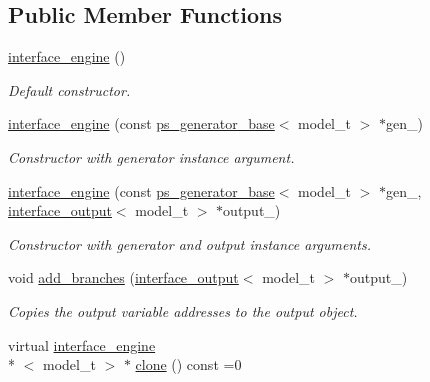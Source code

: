\subsection*{Public Member Functions}
\begin{DoxyCompactItemize}
\item 
\hypertarget{a00314_a343963d3ea0e66429432e8496534c142}{\hyperlink{a00314_a343963d3ea0e66429432e8496534c142}{interface\-\_\-engine} ()}\label{a00314_a343963d3ea0e66429432e8496534c142}

\begin{DoxyCompactList}\small\item\em Default constructor. \end{DoxyCompactList}\item 
\hypertarget{a00314_ad342ed491c8c93e057a8581496fd9dd7}{\hyperlink{a00314_ad342ed491c8c93e057a8581496fd9dd7}{interface\-\_\-engine} (const \hyperlink{a00442}{ps\-\_\-generator\-\_\-base}$<$ model\-\_\-t $>$ $\ast$gen\-\_\-)}\label{a00314_ad342ed491c8c93e057a8581496fd9dd7}

\begin{DoxyCompactList}\small\item\em Constructor with generator instance argument. \end{DoxyCompactList}\item 
\hypertarget{a00314_aa7f1746c6c1a6b5d382308423a16b086}{\hyperlink{a00314_aa7f1746c6c1a6b5d382308423a16b086}{interface\-\_\-engine} (const \hyperlink{a00442}{ps\-\_\-generator\-\_\-base}$<$ model\-\_\-t $>$ $\ast$gen\-\_\-, \hyperlink{a00315}{interface\-\_\-output}$<$ model\-\_\-t $>$ $\ast$output\-\_\-)}\label{a00314_aa7f1746c6c1a6b5d382308423a16b086}

\begin{DoxyCompactList}\small\item\em Constructor with generator and output instance arguments. \end{DoxyCompactList}\item 
\hypertarget{a00314_abcf2a665d45d27762db5e3ba01eae5e1}{void \hyperlink{a00314_abcf2a665d45d27762db5e3ba01eae5e1}{add\-\_\-branches} (\hyperlink{a00315}{interface\-\_\-output}$<$ model\-\_\-t $>$ $\ast$output\-\_\-)}\label{a00314_abcf2a665d45d27762db5e3ba01eae5e1}

\begin{DoxyCompactList}\small\item\em Copies the output variable addresses to the output object. \end{DoxyCompactList}\item 
\hypertarget{a00314_a756e355ca2e52d691dc616acaa3e61be}{virtual \hyperlink{a00314}{interface\-\_\-engine}\\*
$<$ model\-\_\-t $>$ $\ast$ \hyperlink{a00314_a756e355ca2e52d691dc616acaa3e61be}{clone} () const =0}\label{a00314_a756e355ca2e52d691dc616acaa3e61be}


\end{DoxyCompactItemize}
